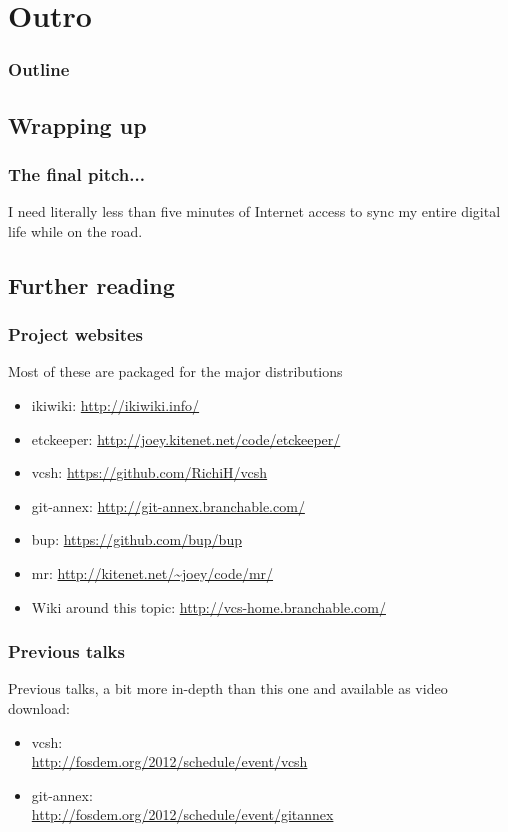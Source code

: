 \documentclass[t]{beamer}
\begin{document}
\section{Outro}

\begin{frame}
	\frametitle{Outline}
	\tableofcontents[currentsection]
\end{frame}

\subsection{Wrapping up}

\begin{frame}
	\frametitle{The final pitch...}
	\vfill
	I need literally less than five minutes of Internet access to sync my entire digital life while on the road.
	\vfill
\end{frame}

\subsection{Further reading}

\begin{frame}
	\frametitle{Project websites}
	Most of these are packaged for the major distributions
	\begin{itemize}
		\item ikiwiki: \url{http://ikiwiki.info/}
		\item etckeeper: \url{http://joey.kitenet.net/code/etckeeper/}
		\item vcsh: \url{https://github.com/RichiH/vcsh}
		\item git-annex: \url{http://git-annex.branchable.com/}
		\item bup: \url{https://github.com/bup/bup}
		\item mr: \url{http://kitenet.net/~joey/code/mr/}
		\item Wiki around this topic: \url{http://vcs-home.branchable.com/}
	\end{itemize}
\end{frame}

\begin{frame}
	\frametitle{Previous talks}
	Previous talks, a bit more in-depth than this one and available as video download:
	\begin{itemize}
		\item vcsh: \\ \url{http://fosdem.org/2012/schedule/event/vcsh}
		\item git-annex: \\ \url{http://fosdem.org/2012/schedule/event/gitannex}
	\end{itemize}
\end{frame}
\end{document}
